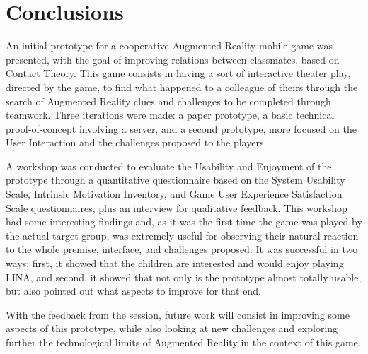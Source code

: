 \section{Conclusions}
\label{sec:concl}
\par An initial prototype for a cooperative Augmented Reality mobile game was presented, with the goal of improving relations between classmates, based on Contact Theory. This game consists in having a sort of interactive theater play, directed by the game, to find what happened to a colleague of theirs through the search of Augmented Reality clues and challenges to be completed through teamwork. Three iterations were made: a paper prototype, a basic technical proof-of-concept involving a server, and a second prototype, more focused on the User Interaction and the challenges proposed to the players.
\par A workshop was conducted to evaluate the Usability and Enjoyment of the prototype through a quantitative questionnaire based on the System Usability Scale, Intrinsic Motivation Inventory, and Game User Experience Satisfaction Scale questionnaires, plus an interview for qualitative feedback. This workshop had some interesting findings and, as it was the first time the game was played by the actual target group, was extremely useful for observing their natural reaction to the whole premise, interface, and challenges proposed. It was successful in two ways: first, it showed that the children are interested and would enjoy playing LINA, and second, it showed that not only is the prototype almost totally usable, but also pointed out what aspects to improve for that end. 
\par With the feedback from the session, future work will consist in improving some aspects of this prototype, while also looking at new challenges and exploring further the technological limits of Augmented Reality in the context of this game.
